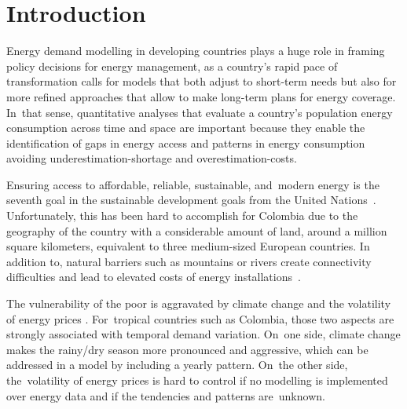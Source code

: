 \documentclass[energies,article,accept,pdftex,moreauthors]{Definitions/mdpi}
\begin{document}

\section{Introduction}


Energy demand modelling in developing countries plays a huge role in framing policy decisions for energy management,  as a country's rapid pace of transformation calls for models that both adjust to short-term needs but also  for more refined approaches that allow to make long-term plans for energy coverage.  In~that sense, quantitative analyses that evaluate a country's population energy consumption across time and space are important because they enable the identification of gaps in energy access and patterns in energy consumption avoiding underestimation-shortage and overestimation-costs.

Ensuring access to affordable, reliable, sustainable, and~modern energy is the seventh goal in the sustainable development goals from the United Nations~\citep{UnitedNations2018AFFORDABLEEfficient}. Unfortunately, this has been hard to accomplish for Colombia due to the geography of the country with a considerable amount of land, around a million square kilometers, equivalent to three medium-sized European countries. In addition to, natural barriers such as mountains or rivers create connectivity difficulties and lead to elevated costs of energy installations~\citep{BustosGonzalez2014NonPerspectives}. 


The vulnerability of the poor is aggravated by climate change and the volatility of energy prices \citep{WHO2009TheCountries} . For~tropical countries such as Colombia, those two aspects are strongly associated with temporal demand variation. On~one side, climate change makes the rainy/dry season more pronounced and aggressive, which can be addressed in a model by including a yearly pattern. On~the other side, the~volatility of energy prices is hard to control if no modelling is implemented over energy data and if the tendencies and patterns are~unknown. \clearpage
\end{document}
